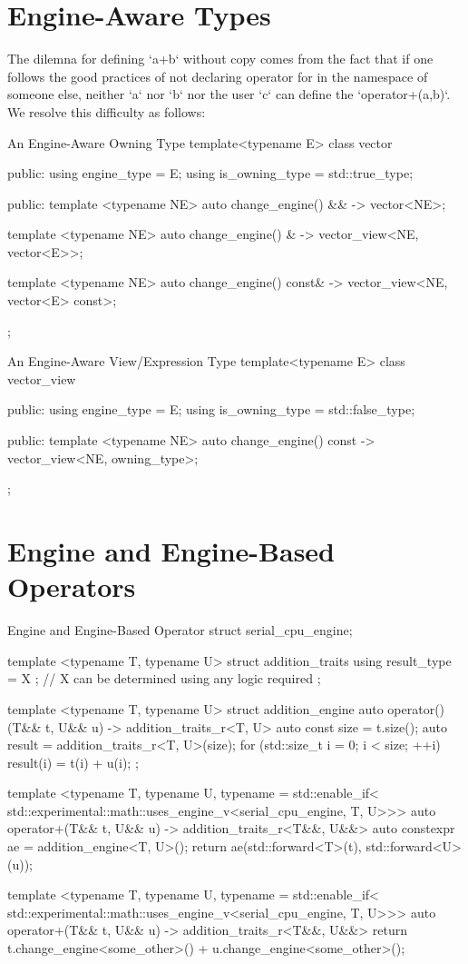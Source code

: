 \documentclass[oneside,11pt,a4paper]{jbarticle}
\begin{document}
\section{Engine-Aware Types}
The dilemna for defining `a+b` without copy comes from the fact that if one
follows the good practices of not declaring operator for in the namespace of
someone else, neither `a` nor `b` nor the user `c` can define the
`operator+(a,b)`. We resolve this difficulty as follows:



\begin{codecpp}{An Engine-Aware Owning Type}
  template<typename E>
  class vector {
  public:
    using engine_type = E;
    using is_owning_type = std::true_type;

  public:
    template <typename NE>
    auto change_engine() && -> vector<NE>;

    template <typename NE>
    auto change_engine() & -> vector_view<NE, vector<E>>;

    template <typename NE>
    auto change_engine() const& -> vector_view<NE, vector<E> const>;
  };
\end{codecpp}

\begin{codecpp}{An Engine-Aware View/Expression Type}
  template<typename E>
  class vector_view {
  public:
    using engine_type = E;
    using is_owning_type = std::false_type;

  public:
    template <typename NE>
    auto change_engine() const -> vector_view<NE, owning_type>;
  };
\end{codecpp}

\section{Engine and Engine-Based Operators}

\begin{codecpp}{Engine and Engine-Based Operator}
struct serial_cpu_engine;

template <typename T, typename U>
struct addition_traits {
  using result_type = X ; // X can be determined using any logic required
};

template <typename T, typename U>
struct addition_engine {
  auto operator()(T&& t, U&& u) -> addition_traits_r<T, U>
  {
    auto const size = t.size();
    auto result = addition_traits_r<T, U>(size);
    for (std::size_t i = 0; i < size; ++i) {
      result(i) = t(i) + u(i);
    }
  }
};

template <typename T,
          typename U,
          typename = std::enable_if<
            std::experimental::math::uses_engine_v<serial_cpu_engine, T, U>>>
auto operator+(T&& t, U&& u) -> addition_traits_r<T&&, U&&>
{
  auto constexpr ae = addition_engine<T, U>();
  return ae(std::forward<T>(t), std::forward<U>(u));
}

template <typename T,
          typename U,
          typename = std::enable_if<
            std::experimental::math::uses_engine_v<serial_cpu_engine, T, U>>>
auto operator+(T&& t, U&& u) -> addition_traits_r<T&&, U&&>
{
  return t.change_engine<some_other>() + u.change_engine<some_other>();
}

\end{codecpp}
\end{document}

